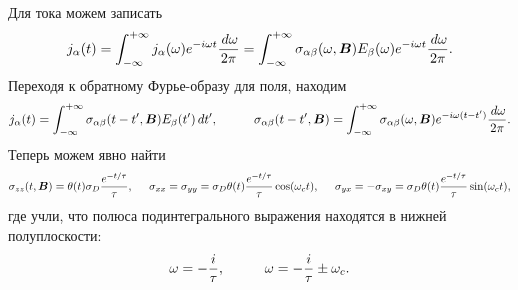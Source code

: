 Для тока можем записать
\begin{equation*}
	j_\alpha (t) = \int_{-\infty}^{+\infty} j_\alpha(\omega) e^{- i \omega t} \frac{\, d \omega}{2\pi} = \int_{-\infty}^{+\infty} \sigma_{\alpha \beta}(\omega, \boldsymbol{B}) E_\beta (\omega) e^{- i \omega t} \frac{\, d \omega}{2\pi}.
\end{equation*}
Переходя к обратному Фурье-образу для поля, находим
\begin{equation*}
	j_\alpha (t) = \int_{-\infty}^{+\infty} 
	\sigma_{\alpha \beta} (t-t', \vc{B})
	 E_\beta (t') \d t',
	 \hspace{10 mm} 
	 \sigma_{\alpha \beta} (t-t', \vc{B}) = \int_{-\infty}^{+\infty} \sigma_{\alpha \beta} (\omega, \vc{B}) e^{- i \omega (t-t')} \frac{\d \omega}{2\pi}.
\end{equation*}
Теперь можем явно найти
\begin{equation*}
	\sigma_{z z} (t, \boldsymbol{B}) = \theta(t)  \sigma_D  \frac{e^{-t/\tau}}{\tau},
	\hspace{5 mm} 
	\sigma_{xx} = \sigma_{yy} = \sigma_D \theta(t) \frac{e^{-t/\tau}}{\tau} \cos(\omega_c t),
	\hspace{5 mm} 
	\sigma_{yx} = - \sigma_{xy} = \sigma_D \theta(t) \frac{e^{-t/\tau}}{\tau} \sin(\omega_c t),
\end{equation*}
где учли, что полюса подинтегрального выражения находятся в нижней полуплоскости:
\begin{equation*}
	\omega = - \frac{i}{\tau}, \hspace{10 mm} 
	\omega = - \frac{i}{\tau} \pm \omega_c.
\end{equation*}




